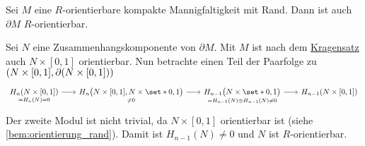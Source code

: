 \begin{lemma}[{name=[Orientierbarkeit des Randes]}]
	Sei $M$ eine $R$-orientierbare kompakte Mannigfaltigkeit mit Rand.
	Dann ist auch $\partial M$ $R$-orientierbar.
\end{lemma}
\begin{beweis}
	Sei $N$ eine Zusammenhangskomponente von $\partial M$.
	Mit $M$ ist nach dem \hyperref[kragensatz]{Kragensatz} auch $N \times [0,1]$ orientierbar.
	Nun betrachte einen Teil der Paarfolge zu $\enbrace*{N \times [0,1], \partial (N \times [0,1])}$
	\[
		\begin{tikzcd}[sep=1.8em]
			\underset{=H_n(N)=0}{H_n(N \times [0,1])} \rar & \underset{\neq 0}{H_n \enbrace[\big]{N \times [0,1], N \times \set*{0,1}}} \rar & \underset{= H_{n-1}(N) \oplus H_{n-1}(N) \neq 0}{H_{n-1} \enbrace[\big]{N \times \set*{0,1}}} \rar & H_{n-1} \enbrace*{N \times [0,1]}
		\end{tikzcd}
	\]
	Der zweite Modul ist nicht trivial, da $N \times [0,1]$ orientierbar ist (siehe \autoref{bem:orientierung_rand}).
	Damit ist $H_{n-1}(N)\neq 0$ und $N$ ist $R$-orientierbar.
\end{beweis}

